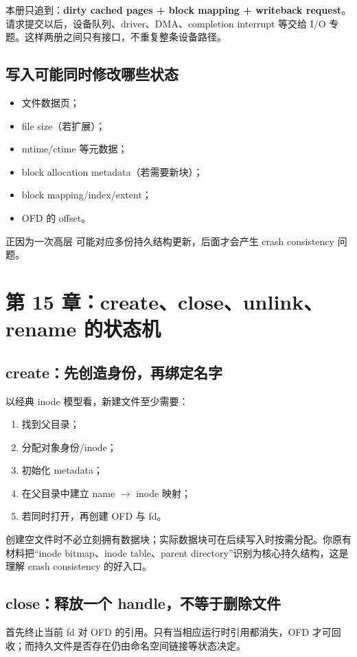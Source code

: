 \documentclass[11pt,a4paper]{ctexart}
\newcommand{\kw}[1]{\textbf{#1}}
\newcommand{\code}[1]{\texttt{\detokenize{#1}}}
\begin{document}
\begin{bridge}[与 I/O 专题接口]
本册只追到：\kw{dirty cached pages + block mapping + writeback request}。请求提交以后，设备队列、driver、DMA、completion interrupt 等交给 I/O 专题。这样两册之间只有接口，不重复整条设备路径。
\end{bridge}

\subsection{写入可能同时修改哪些状态}
\begin{itemize}
  \item 文件数据页；
  \item file size（若扩展）；
  \item mtime/ctime 等元数据；
  \item block allocation metadata（若需要新块）；
  \item block mapping/index/extent；
  \item OFD 的 offset。
\end{itemize}
正因为一次高层 \code{write} 可能对应多份持久结构更新，后面才会产生 crash consistency 问题。

\section{第 15 章：create、close、unlink、rename 的状态机}

\subsection{create：先创造身份，再绑定名字}
以经典 inode 模型看，新建文件至少需要：
\begin{enumerate}
  \item 找到父目录；
  \item 分配对象身份/inode；
  \item 初始化 metadata；
  \item 在父目录中建立 name $\to$ inode 映射；
  \item 若同时打开，再创建 OFD 与 fd。
\end{enumerate}
创建空文件时不必立刻拥有数据块；实际数据块可在后续写入时按需分配。你原有材料把“inode bitmap、inode table、parent directory”识别为核心持久结构，这是理解 crash consistency 的好入口。

\subsection{close：释放一个 handle，不等于删除文件}
\code{close(fd)} 首先终止当前 fd 对 OFD 的引用。只有当相应运行时引用都消失，OFD 才可回收；而持久文件是否存在仍由命名空间链接等状态决定。
\end{document}
